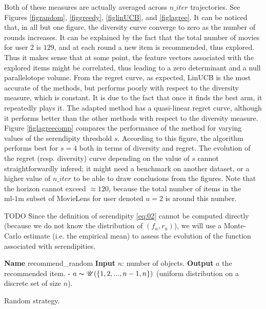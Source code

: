 \documentclass{article}
\begin{document}
Both of these measures are actually averaged across $n\_iter$ trajectories. See Figures \ref{figrandom}, \ref{figgreedy}, \ref{figlinUCB}, and \ref{figlagree}. It can be noticed that, in all but one figure, the diversity curve converge to zero as the number of rounds increases. It can be explained by the fact that the total number of movies for user $2$ is $129$, and at each round a new item is recommended, thus explored. Thus it makes sense that at some point, the feature vectors associated with the explored items might be correlated, thus leading to a zero determinant and a null parallelotope volume. From the regret curve, as expected, LinUCB is the most accurate of the methods, but performs poorly with respect to the diversity measure, which is constant. It is due to the fact that once it finds the best arm, it repeatedly plays it. The adapted method has a quasi-linear regret curve, although it performs better than the other methods with respect to the diversity measure. Figure \ref{figlagreecomp} compares the performance of the method for varying values of the serendipity threshold $s$. According to this figure, the algorithm performs best for $s=4$ both in terms of diversity and regret. The evolution of the regret (resp. diversity) curve depending on the value of $s$ cannot straightforwardly infered; it might need a benchmark on another dataset, or a higher value of $n\_iter$ to be able to draw conclusions from the figures. Note that the horizon cannot exceed $\approx 120$, because the total number of items in the $\text{ml-1m}$ subset of MovieLens for user denoted $u=2$ is around this number.

TODO Since the definition of serendipity \ref{eq:02} cannot be computed directly (because we do not know the distribution of $(f_{u}, r_{u})$), we will use a Monte-Carlo estimate (i.e. the empirical mean) to assess the evolution of the function associated with serendipities.

\begin{algorithm}
\begin{algorithmic}
\STATE \textbf{Name} recommend\_random
\STATE \textbf{Input} $n$: number of objects.
\STATE \textbf{Output} $a$ the recommended item.
\STATE - $a \thicksim \mathscr{U}(\{1, 2, ..., n-1, n\})$ (uniform distribution on a discrete set of size $n$).
\end{algorithmic}
\caption{Random strategy.}
\label{random}
\end{algorithm}
\end{document}
